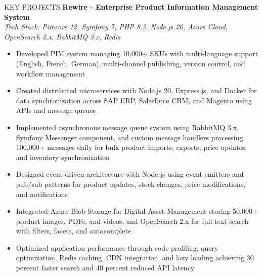 \documentclass{resume} %
\begin{document}
\begin{rSection}{KEY PROJECTS}
\textbf{Rewire - Enterprise Product Information Management System}\\
\textit{Tech Stack: Pimcore 12, Symfony 7, PHP 8.3, Node.js 20, Azure Cloud, OpenSearch 2.x, RabbitMQ 3.x, Redis}
\begin{itemize}
    \itemsep -3pt {}
    \item Developed PIM system managing 10,000+ SKUs with multi-language support (English, French, German), multi-channel publishing, version control, and workflow management
    \item Created distributed microservices with Node.js 20, Express.js, and Docker for data synchronization across SAP ERP, Salesforce CRM, and Magento using APIs and message queues
    \item Implemented asynchronous message queue system using RabbitMQ 3.x, Symfony Messenger component, and custom message handlers processing 100,000+ messages daily for bulk product imports, exports, price updates, and inventory synchronization
    \item Designed event-driven architecture with Node.js using event emitters and pub/sub patterns for product updates, stock changes, price modifications, and notifications
    \item Integrated Azure Blob Storage for Digital Asset Management storing 50,000+ product images, PDFs, and videos, and OpenSearch 2.x for full-text search with filters, facets, and autocomplete
    \item Optimized application performance through code profiling, query optimization, Redis caching, CDN integration, and lazy loading achieving 30 percent faster search and 40 percent reduced API latency
\end{itemize}

\end{rSection}

\end{document}
